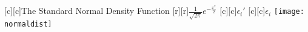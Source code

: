 \documentclass{standalone}
\begin{document}
[c][c]{The Standard Normal Density Function}
[r][r]{$\frac{1}{\sqrt{2\pi}} e^{-\frac{x^2}{2}}$}
[c][c]{$\epsilon_i'$}
[c][c]{$\epsilon_i$}
\texttt{[image: normaldist]}
\end{document}
